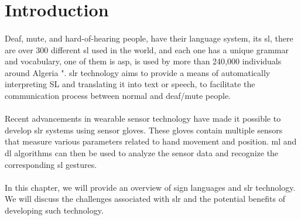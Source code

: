 \section{Introduction}
\paragraph{}
Deaf, mute, and hard-of-hearing people, have their language system, its \ac{sl}, there are over 300 different \ac{sl} used in the world, and each one has a unique grammar and vocabulary, one of them is \ac{asp}, is used by more than 240,000 individuals around Algeria "\cite{ethnologue}. \ac{slr} technology aims to provide a means of automatically interpreting SL and translating it into text or speech, to facilitate the communication process between normal and deaf/mute people.
\paragraph{}
Recent advancements in wearable sensor technology have made it possible to develop \ac{slr} systems using sensor gloves. These gloves contain multiple sensors that measure various parameters related to hand movement and position. \ac{ml} and \ac{dl} algorithms can then be used to analyze the sensor data and recognize the corresponding \ac{sl} gestures.
\paragraph{}
In this chapter, we will provide an overview of sign languages and \ac{slr} technology. We will discuss the challenges associated with \ac{slr} and the potential benefits of developing such technology.